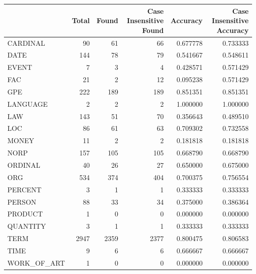 \begin{tabular}{lrrrrr}
\toprule
 & Total & Found & Case Insensitive Found & Accuracy & Case Insensitive Accuracy \\
\midrule
CARDINAL & 90 & 61 & 66 & 0.677778 & 0.733333 \\
DATE & 144 & 78 & 79 & 0.541667 & 0.548611 \\
EVENT & 7 & 3 & 4 & 0.428571 & 0.571429 \\
FAC & 21 & 2 & 12 & 0.095238 & 0.571429 \\
GPE & 222 & 189 & 189 & 0.851351 & 0.851351 \\
LANGUAGE & 2 & 2 & 2 & 1.000000 & 1.000000 \\
LAW & 143 & 51 & 70 & 0.356643 & 0.489510 \\
LOC & 86 & 61 & 63 & 0.709302 & 0.732558 \\
MONEY & 11 & 2 & 2 & 0.181818 & 0.181818 \\
NORP & 157 & 105 & 105 & 0.668790 & 0.668790 \\
ORDINAL & 40 & 26 & 27 & 0.650000 & 0.675000 \\
ORG & 534 & 374 & 404 & 0.700375 & 0.756554 \\
PERCENT & 3 & 1 & 1 & 0.333333 & 0.333333 \\
PERSON & 88 & 33 & 34 & 0.375000 & 0.386364 \\
PRODUCT & 1 & 0 & 0 & 0.000000 & 0.000000 \\
QUANTITY & 3 & 1 & 1 & 0.333333 & 0.333333 \\
TERM & 2947 & 2359 & 2377 & 0.800475 & 0.806583 \\
TIME & 9 & 6 & 6 & 0.666667 & 0.666667 \\
WORK_OF_ART & 1 & 0 & 0 & 0.000000 & 0.000000 \\
\bottomrule
\end{tabular}
